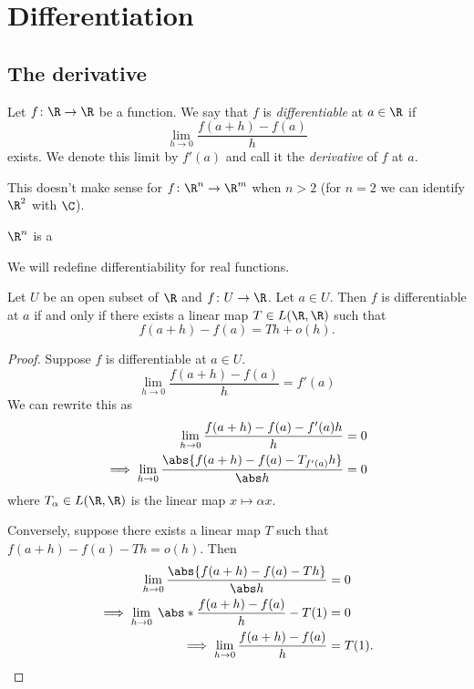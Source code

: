 \chapter{Differentiation} \label{chp:dv}
\section{The derivative} \label{sec:dv}
\begin{definition} \label{def:dv}
    Let $f\colon \R \to \R$ be a function.
    We say that $f$ is \emph{differentiable} at $a \in \R$ if \[
        \lim_{h \to 0} \frac{f(a + h) - f(a)}{h}
    \] exists.
    We denote this limit by $f'(a)$ and call it the \emph{derivative}
    of $f$ at $a$.
\end{definition}
This doesn't make sense for $f\colon \R^n \to \R^m$ when $n > 2$
(for $n = 2$ we can identify $\R^2$ with $\C$).

\begin{theorem} \label{thm:dv:hurwitz}
    $\R^n$ is a 
\end{theorem}

We will redefine differentiability for real functions.
\begin{proposition*}
    Let $U$ be an open subset of $\R$ and $f\colon U \to \R$.
    Let $a \in U$.
    Then $f$ is differentiable at $a$ if and only if there exists
    a linear map $T \in L(\R, \R)$ such that \[
        f(a + h) - f(a) = Th + o(h).
    \]
\end{proposition*}
\begin{proof}
    Suppose $f$ is differentiable at $a \in U$. \[
        \lim_{h \to 0} \frac{f(a + h) - f(a)}h = f'(a)
    \]
    We can rewrite this as \begin{align*}
        \lim_{h \to 0} \frac{f(a + h) - f(a) - f'(a)h}h &= 0 \\
        \implies \lim_{h \to 0} \frac{\abs{f(a + h) - f(a) - T_{f'(a)}h}}{\abs h} &= 0
    \end{align*} where $T_\alpha \in L(\R, \R)$ is the linear map
    $x \mapsto \alpha x$.

    Conversely, suppose there exists a linear map $T$ such that
    $f(a + h) - f(a) - Th = o(h)$.
    Then \begin{align*}
        \lim_{h \to 0} \frac{\abs{f(a + h) - f(a) - Th}}{\abs h} &= 0 \\
        \implies \lim_{h \to 0}\;\abs*{\frac{f(a+h) - f(a)}h - T(1)} &= 0 \\
        \implies \lim_{h \to 0} \frac{f(a + h) - f(a)}h &= T(1). \qedhere
    \end{align*}
\end{proof}
